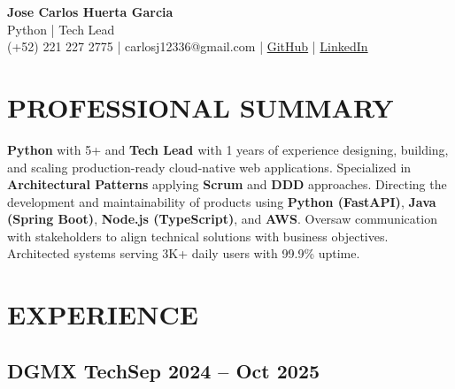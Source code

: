 \documentclass[a4paper,10pt]{article}
\newcommand{\kw}[1]{\textbf{\textcolor{keyword}{#1}}}
\begin{document}
\begin{center}
{\bfseries\LARGE Jose Carlos Huerta Garcia} \\
Python | Tech Lead \\
(+52) 221 227 2775 | carlosj12336@gmail.com | \href{https://github.com/jcarloshg}{GitHub} | \href{https://www.linkedin.com/in/jose-carlos-huerta-garcia-773952212}{LinkedIn}
\end{center}

\section*{PROFESSIONAL SUMMARY}
\kw{Python} with 5+ and \kw{Tech Lead } with 1 years of experience designing, building, and scaling production-ready cloud-native web applications. Specialized in \kw{Architectural Patterns} applying \kw{Scrum} and \kw{DDD} approaches. Directing the development and maintainability of products using \kw{Python (FastAPI)}, \kw{Java (Spring Boot)}, \kw{Node.js (TypeScript)}, and \kw{AWS}. Oversaw communication with stakeholders to align technical solutions with business objectives. Architected systems serving 3K+ daily users with 99.9\% uptime.

\section*{EXPERIENCE}

\subsection*{\small DGMX Tech\hfill\textbf{Sep 2024 -- Oct 2025}}
\end{document}
